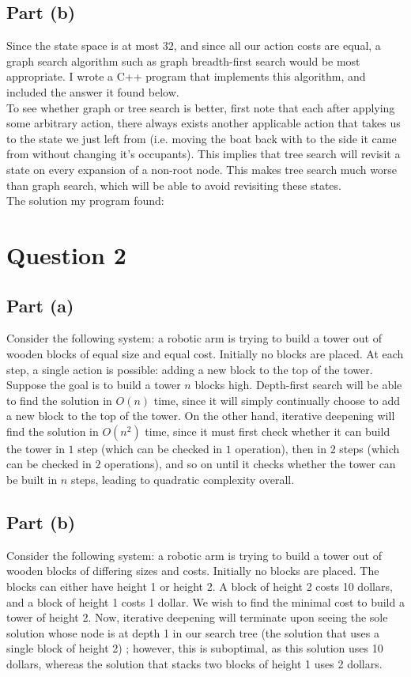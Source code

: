 \documentclass[a4paper,12pt]{scrartcl}
\begin{document}
\subsection*{Part (b)}
Since the state space is at most $32$, and since all our action costs are equal, a graph search algorithm such as graph breadth-first search would be most appropriate. I wrote a C++ program that implements this algorithm, and included the answer it found below. \\
To see whether graph or tree search is better, first note that each after applying some arbitrary action, there always exists another applicable action that takes us to the state we just left from (i.e. moving the boat back with to the side it came from without changing it's occupants). This implies that tree search will revisit a state on every expansion of a non-root node. This makes tree search much worse than graph search, which will be able to avoid revisiting these states. \\
The solution my program found: \\



\section*{Question 2}
\subsection*{Part (a)}
Consider the following system: a robotic arm is trying to build a tower out of wooden blocks of equal size and equal cost. Initially no blocks are placed. At each step, a single action is possible: adding a new block to the top of the tower. Suppose the goal is to build a tower $n$ blocks high. Depth-first search will be able to find the solution in $O(n)$ time, since it will simply continually choose to add a new block to the top of the tower. On the other hand, iterative deepening will find the solution in $O(n^2)$ time, since it must first check whether it can build the tower in $1$ step (which can be checked in $1$ operation), then in $2$ steps (which can be checked in $2$ operations), and so on until it checks whether the tower can be built in $n$ steps, leading to quadratic complexity overall.

\subsection*{Part (b)}
Consider the following system: a robotic arm is trying to build a tower out of wooden blocks of differing sizes and costs. Initially no blocks are placed. The blocks can either have height 1 or height 2. A block of height 2 costs 10 dollars, and a block of height 1 costs 1 dollar. We wish to find the minimal cost to build a tower of height 2. Now, iterative deepening will terminate upon seeing the sole solution whose node is at depth 1 in our search tree (the solution that uses a single block of height 2) ; however, this is suboptimal, as this solution uses 10 dollars, whereas the solution that stacks two blocks of height 1 uses 2 dollars.
\end{document}

